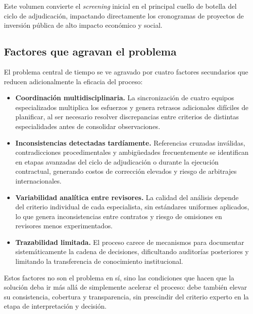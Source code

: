 Este volumen convierte el \textit{screening} inicial en el principal cuello de botella
del ciclo de adjudicación, impactando directamente los cronogramas de proyectos de
inversión pública de alto impacto económico y social.

\subsection{Factores que agravan el problema}

El problema central de tiempo se ve agravado por cuatro factores secundarios que
reducen adicionalmente la eficacia del proceso:

\begin{itemize}
    \item \textbf{Coordinación multidisciplinaria.} La sincronización de cuatro
    equipos especializados multiplica los esfuerzos y genera retrasos adicionales
    difíciles de planificar, al ser necesario resolver discrepancias entre criterios
    de distintas especialidades antes de consolidar observaciones.

    \item \textbf{Inconsistencias detectadas tardíamente.} Referencias cruzadas
    inválidas, contradicciones procedimentales y ambigüedades frecuentemente se
    identifican en etapas avanzadas del ciclo de adjudicación o durante la ejecución
    contractual, generando costos de corrección elevados y riesgo de arbitrajes
    internacionales.

    \item \textbf{Variabilidad analítica entre revisores.} La calidad del análisis
    depende del criterio individual de cada especialista, sin estándares uniformes
    aplicados, lo que genera inconsistencias entre contratos y riesgo de omisiones
    en revisores menos experimentados.

    \item \textbf{Trazabilidad limitada.} El proceso carece de mecanismos para
    documentar sistemáticamente la cadena de decisiones, dificultando auditorías
    posteriores y limitando la transferencia de conocimiento institucional.
\end{itemize}

Estos factores no son el problema en sí, sino las condiciones que hacen que la
solución deba ir más allá de simplemente acelerar el proceso: debe también elevar
su consistencia, cobertura y transparencia, sin prescindir del criterio experto
en la etapa de interpretación y decisión.

